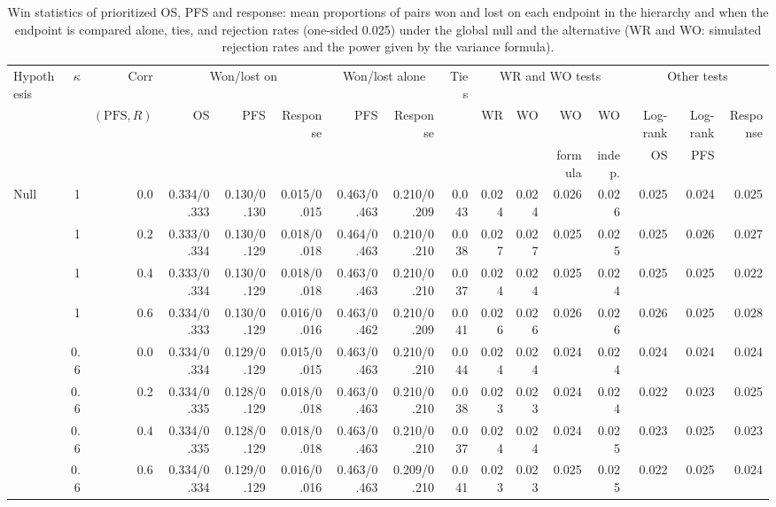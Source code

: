 \begin{table}[htbp]
\centering
\caption{Win statistics of prioritized OS, PFS and response: mean proportions of pairs won and lost on each endpoint in the hierarchy and when the endpoint is compared alone, ties, and rejection rates (one-sided 0.025) under the global null and the alternative (WR and WO: simulated rejection rates and the power given by the variance formula).}
\label{tab:winfull}
\begin{threeparttable}
\scriptsize\setlength{\tabcolsep}{2pt}
\begin{tabular}{lrrrrrrrrrrrrrrr}
\toprule
Hypothesis & $\kappa$ & $\mathrm{Corr}$ & \multicolumn{3}{c}{Won/lost on} & \multicolumn{2}{c}{Won/lost alone} & Ties & \multicolumn{4}{c}{WR and WO tests} & \multicolumn{3}{c}{Other tests} \\
\cmidrule(lr){4-6} \cmidrule(lr){7-8} \cmidrule(lr){10-13} \cmidrule(lr){14-16}
 &  & $(\mathrm{PFS}, R)$ & OS & PFS & Response & PFS & Response &  & WR & WO & WO & WO & Log-rank & Log-rank & Response \\
 &  &  &  &  &  &  &  &  &  &  & formula & indep. & OS & PFS &  \\
\midrule
Null & 1 & 0.0 & 0.334/0.333 & 0.130/0.130 & 0.015/0.015 & 0.463/0.463 & 0.210/0.209 & 0.043 & 0.024 & 0.024 & 0.026 & 0.026 & 0.025 & 0.024 & 0.025 \\
 & 1 & 0.2 & 0.333/0.334 & 0.130/0.129 & 0.018/0.018 & 0.464/0.463 & 0.210/0.210 & 0.038 & 0.027 & 0.027 & 0.025 & 0.025 & 0.025 & 0.026 & 0.027 \\
 & 1 & 0.4 & 0.333/0.334 & 0.130/0.129 & 0.018/0.018 & 0.463/0.463 & 0.210/0.210 & 0.037 & 0.024 & 0.024 & 0.025 & 0.024 & 0.025 & 0.025 & 0.022 \\
 & 1 & 0.6 & 0.334/0.333 & 0.130/0.129 & 0.016/0.016 & 0.463/0.462 & 0.210/0.209 & 0.041 & 0.026 & 0.026 & 0.026 & 0.026 & 0.026 & 0.025 & 0.028 \\
 & 0.6 & 0.0 & 0.334/0.334 & 0.129/0.129 & 0.015/0.015 & 0.463/0.463 & 0.210/0.210 & 0.044 & 0.024 & 0.024 & 0.024 & 0.024 & 0.024 & 0.024 & 0.024 \\
 & 0.6 & 0.2 & 0.334/0.335 & 0.128/0.129 & 0.018/0.018 & 0.463/0.463 & 0.210/0.210 & 0.038 & 0.023 & 0.023 & 0.024 & 0.024 & 0.022 & 0.023 & 0.025 \\
 & 0.6 & 0.4 & 0.334/0.335 & 0.128/0.129 & 0.018/0.018 & 0.463/0.463 & 0.210/0.210 & 0.037 & 0.024 & 0.024 & 0.024 & 0.025 & 0.023 & 0.025 & 0.023 \\
 & 0.6 & 0.6 & 0.334/0.334 & 0.129/0.129 & 0.016/0.016 & 0.463/0.463 & 0.209/0.210 & 0.041 & 0.023 & 0.023 & 0.025 & 0.025 & 0.022 & 0.025 & 0.024 \\

\end{tabular}
\end{threeparttable}
\end{table}

